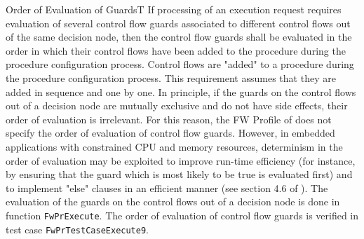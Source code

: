 \documentclass[a4paper,10pt]{article}
\newenvironment{fw_req_note}[7]
{\addtocounter{subsubsection}{1}
	\hspace{0.2cm}\textbf{FW-\arabic{section}.\arabic{subsection}.\arabic{subsubsection}/#2
	\hspace{0.8cm} #1}
	\vspace{-10pt}
\begin{longtable}{p{2.7cm}P{8.5cm}}
\hline
\textsc{Requirement} & #3 \\
\textsc{Note} & #4 \\
\textsc{Justification} & #5 \\
\textsc{Implementation} & #6  \\ 
\textsc{Verification} & #7  \\
\hline
}
{\end{longtable}}
\begin{document}
\begin{fw_req_note}{Order of Evaluation of Guards}{T}
{If processing of an execution request requires evaluation of several control flow guards associated to different control flows out of the same decision node, then the control flow guards shall be evaluated in the order in which their control flows have been added to the procedure during the procedure configuration process.}
{Control flows are "added" to a procedure during the procedure configuration process.
This requirement assumes that they are added in sequence and one by one.}
{In principle, if the guards on the control flows out of a decision node are mutually exclusive and do not have side effects, their order of evaluation is irrelevant. 
For this reason, the FW Profile of \cite{ref:fwprofile} does not specify the order of evaluation of control flow guards.
However, in embedded applications with constrained CPU and memory resources, determinism in the order of evaluation may be exploited to improve run-time efficiency (for instance, by ensuring that the guard which is most likely to be true is evaluated first) and to implement "else" clauses in an efficient manner (see section 4.6 of \cite{ref:um}).}
{The evaluation of the guards on the control flows out of a decision node is done in function \texttt{FwPrExecute}.} 
{The order of evaluation of control flow guards is verified in test case \texttt{FwPrTestCaseExecute9}.}
\end{fw_req_note}
\end{document}
